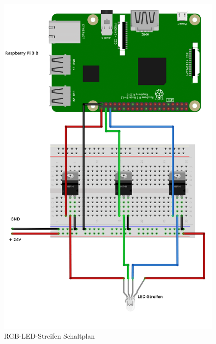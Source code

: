 \begin{figure}[hp]
    \centering
    \includegraphics[width=13cm]{images/led_stripe}
    \caption{RGB-LED-Streifen Schaltplan}
\end{figure}

\newpage
